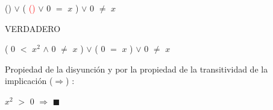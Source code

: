 \documentclass[12pt]{article}
\renewcommand{\qedsymbol}{$\blacksquare$}
\begin{document}
{\textcolor{verde_manzana}{({{\underline{}}})}} \hspace{0.2cm} $\vee$ \hspace{0.2cm} (\hspace{0.2cm} {\textcolor{red}{({{\underline{}}})}} \hspace{0.2cm} $\vee$  \hspace{0.2cm} $0$ $=$ $x$ \hspace{0.2cm})  $\vee$ \vspace{0.2cm} $0$ $\neq$ $x$ 

\hspace{0.6cm} {\textcolor{verde_manzana}{VERDADERO}} \hspace{4.5cm} {}

(\hspace{0.2cm} $0$ $<$ $x^{2}$ \hspace{0.2cm} $\wedge$ \hspace{0.2cm} $0$ $\neq$ $x$ \hspace{0.2cm}) \hspace{0.2cm} $\vee$ \hspace{0.2cm} (\hspace{0.2cm} $0$ $=$ $x$ \hspace{0.2cm}) \hspace{0.2cm} $\vee$ \hspace{0.2cm} $0$ $\neq$ $x$ \vspace{0.5cm}

{\textcolor{carrotorange}{Propiedad de la disyunción}} {\textcolor{palatinateblue}{y}} {\textcolor{carrotorange}{por la propiedad de la transitividad de la implicación {\textcolor{vividviolet}{($\Longrightarrow$)}}}} {\textcolor{carrotorange}{:}} \vspace{0.5cm}

$x^{2}$ $>$ $0$ $\Longrightarrow$  \hspace{.6cm} \textcolor{carrotorange}{\qedsymbol}




\newpage
\end{document}
